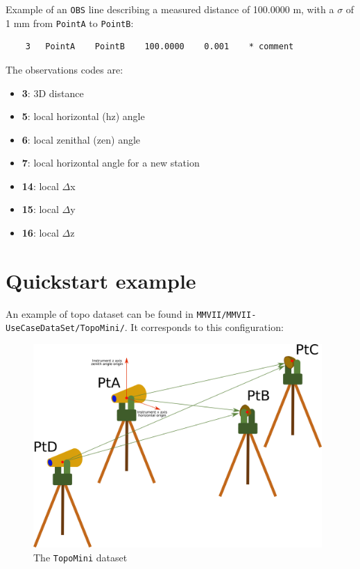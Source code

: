Example of an \texttt{OBS} line describing a measured distance of 100.0000 m, with a $\sigma$ of 1 mm from \texttt{PointA} to \texttt{PointB}:

\begin{verbatim}
    3   PointA    PointB    100.0000    0.001    * comment
\end{verbatim}

The observations codes are:

\begin{itemize}
    \item \textbf{3}: 3D distance
    \item \textbf{5}: local horizontal (hz) angle
    \item \textbf{6}: local zenithal (zen) angle
    \item \textbf{7}: local horizontal angle for a new station 
    \item \textbf{14}: local $\Delta$x
    \item \textbf{15}: local $\Delta$y
    \item \textbf{16}: local $\Delta$z
\end{itemize}

\newpage
\section{Quickstart example}

An example of topo dataset can be found in \texttt{MMVII/MMVII-UseCaseDataSet/TopoMini/}.
It corresponds to this configuration:

\begin{figure}[!h]
\centering
\includegraphics[width=11cm]{CommandReferences/ImagesComRef/topo2.png}
\caption{The \texttt{TopoMini} dataset}
\label{fig:topoSurvey}
\end{figure}

